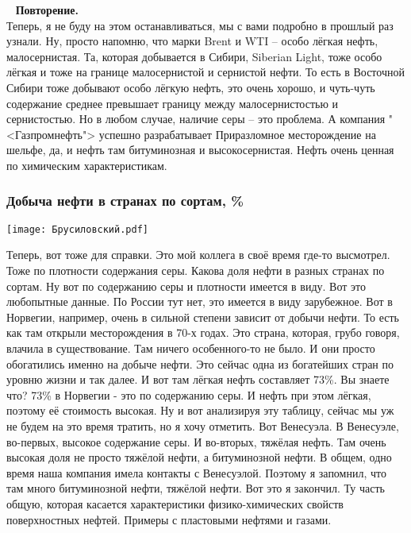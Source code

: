 \documentclass[main.tex]{subfiles}
\begin{document}
\ \newline
\textbf{Повторение.}\\
Теперь, я не буду на этом останавливаться, мы с вами подробно в прошлый раз узнали.
Ну, просто напомню, что марки Brent и WTI -- особо лёгкая нефть, малосернистая.
Та, которая добывается в Сибири, Siberian Light, тоже особо лёгкая и тоже на границе малосернистой и сернистой нефти.
То есть в Восточной Сибири тоже добывают особо лёгкую нефть, это очень хорошо, и чуть-чуть содержание среднее превышает границу между малосернистостью и сернистостью.
Но в любом случае, наличие серы -- это проблема.
А компания "<Газпромнефть"> успешно разрабатывает Приразломное месторождение на шельфе, да, и нефть там битуминозная и высокосернистая.
Нефть очень ценная по химическим характеристикам.

\subsubsection{Добыча нефти в странах по сортам, \%}

\begin{center}
\texttt{[image: Брусиловский.pdf]}
\end{center}

Теперь, вот тоже для справки.
Это мой коллега в своё время где-то высмотрел.
Тоже по плотности содержания серы.
Какова доля нефти в разных странах по сортам.
Ну вот по содержанию серы и плотности имеется в виду.
Вот это любопытные данные.
По России тут нет, это имеется в виду зарубежное.
Вот в Норвегии, например, очень в сильной степени зависит от добычи нефти.
То есть как там открыли месторождения в 70-х годах.
Это страна, которая, грубо говоря, влачила в существование.
Там ничего особенного-то не было.
И они просто обогатились именно на добыче нефти.
Это сейчас одна из богатейших стран по уровню жизни и так далее.
И вот там лёгкая нефть составляет 73\%.
Вы знаете что?
73\% в Норвегии - это по содержанию серы.
И нефть при этом лёгкая, поэтому её стоимость высокая.
Ну и вот анализируя эту таблицу, сейчас мы уж не будем на это время тратить, но я хочу отметить.
Вот Венесуэла.
В Венесуэле, во-первых, высокое содержание серы.
И во-вторых, тяжёлая нефть.
Там очень высокая доля не просто тяжёлой нефти, а битуминозной нефти.
В общем, одно время наша компания имела контакты с Венесуэлой.
Поэтому я запомнил, что там много битуминозной нефти, тяжёлой нефти.
Вот это я закончил.
Ту часть общую, которая касается характеристики физико-химических свойств поверхностных нефтей.
Примеры с пластовыми нефтями и газами.
\end{document}
